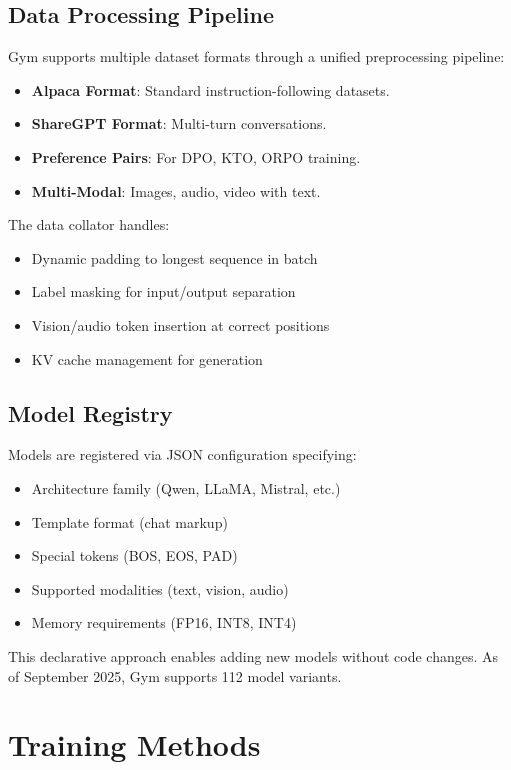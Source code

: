 \documentclass[11pt,letterpaper]{article}
\begin{document}
\subsection{Data Processing Pipeline}

Gym supports multiple dataset formats through a unified preprocessing pipeline:

\begin{itemize}
\item \textbf{Alpaca Format}: Standard instruction-following datasets.
\item \textbf{ShareGPT Format}: Multi-turn conversations.
\item \textbf{Preference Pairs}: For DPO, KTO, ORPO training.
\item \textbf{Multi-Modal}: Images, audio, video with text.
\end{itemize}

The data collator handles:
\begin{itemize}
\item Dynamic padding to longest sequence in batch
\item Label masking for input/output separation
\item Vision/audio token insertion at correct positions
\item KV cache management for generation
\end{itemize}

\subsection{Model Registry}

Models are registered via JSON configuration specifying:
\begin{itemize}
\item Architecture family (Qwen, LLaMA, Mistral, etc.)
\item Template format (chat markup)
\item Special tokens (BOS, EOS, PAD)
\item Supported modalities (text, vision, audio)
\item Memory requirements (FP16, INT8, INT4)
\end{itemize}

This declarative approach enables adding new models without code changes. As of September 2025, Gym supports 112 model variants.

\section{Training Methods}
\end{document}
